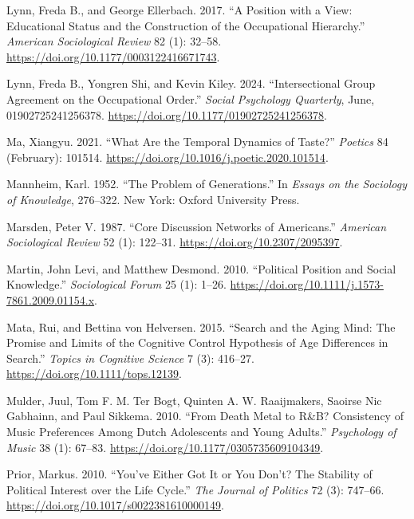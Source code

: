 \documentclass[
  12pt,
]{article}
\newlength{\cslhangindent}
\newlength{\cslentryspacingunit} %
\newenvironment{CSLReferences}[2] %
 {%
  \setlength{\parindent}{0pt}
  \ifodd #1
  \let\oldpar\par
  \def\par{\hangindent=\cslhangindent\oldpar}
  \fi
  \setlength{\parskip}{#2\cslentryspacingunit}
 }%
 {}
\begin{document}
\begin{CSLReferences}{1}{0}
\leavevmode{}%
Lynn, Freda B., and George Ellerbach. 2017. {``A {Position} with a {View}: {Educational} {Status} and the {Construction} of the {Occupational} {Hierarchy}.''} \emph{American Sociological Review} 82 (1): 32--58. \url{https://doi.org/10.1177/0003122416671743}.

\leavevmode{}%
Lynn, Freda B., Yongren Shi, and Kevin Kiley. 2024. {``Intersectional {Group} {Agreement} on the {Occupational} {Order}.''} \emph{Social Psychology Quarterly}, June, 01902725241256378. \url{https://doi.org/10.1177/01902725241256378}.

\leavevmode{}%
Ma, Xiangyu. 2021. {``What Are the Temporal Dynamics of Taste?''} \emph{Poetics} 84 (February): 101514. \url{https://doi.org/10.1016/j.poetic.2020.101514}.

\leavevmode{}%
Mannheim, Karl. 1952. {``The {Problem} of {Generations}.''} In \emph{Essays on the {Sociology} of {Knowledge}}, 276--322. New York: Oxford University Press.

\leavevmode{}%
Marsden, Peter V. 1987. {``Core {Discussion} {Networks} of {Americans}.''} \emph{American Sociological Review} 52 (1): 122--31. \url{https://doi.org/10.2307/2095397}.

\leavevmode{}%
Martin, John Levi, and Matthew Desmond. 2010. {``Political {Position} and {Social} {Knowledge}.''} \emph{Sociological Forum} 25 (1): 1--26. \url{https://doi.org/10.1111/j.1573-7861.2009.01154.x}.

\leavevmode{}%
Mata, Rui, and Bettina von Helversen. 2015. {``Search and the {Aging} {Mind}: {The} {Promise} and {Limits} of the {Cognitive} {Control} {Hypothesis} of {Age} {Differences} in {Search}.''} \emph{Topics in Cognitive Science} 7 (3): 416--27. \url{https://doi.org/10.1111/tops.12139}.

\leavevmode{}%
Mulder, Juul, Tom F. M. Ter Bogt, Quinten A. W. Raaijmakers, Saoirse Nic Gabhainn, and Paul Sikkema. 2010. {``From Death Metal to {R}\&{B}? {Consistency} of Music Preferences Among {Dutch} Adolescents and Young Adults.''} \emph{Psychology of Music} 38 (1): 67--83. \url{https://doi.org/10.1177/0305735609104349}.

\leavevmode{}%
Prior, Markus. 2010. {``You've {Either} {Got} {It} or {You} {Don}'t? {The} {Stability} of {Political} {Interest} over the {Life} {Cycle}.''} \emph{The Journal of Politics} 72 (3): 747--66. \url{https://doi.org/10.1017/s0022381610000149}.


\end{CSLReferences}
\end{document}
